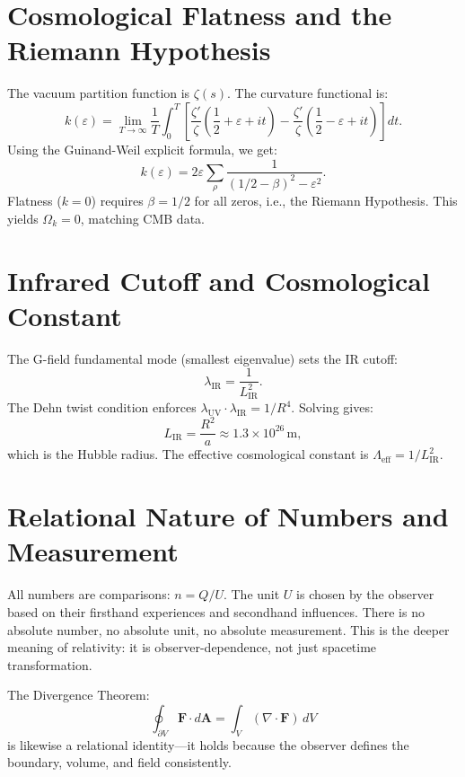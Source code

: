 \documentclass[11pt, a4paper, twocolumn]{article}
\theoremstyle{plain}
\theoremstyle{definition}
\begin{document}
\section{Cosmological Flatness and the Riemann Hypothesis}
\label{sec:riemann}

The vacuum partition function is $\zeta(s)$. The curvature functional is:
\[
k(\varepsilon) = \lim_{T\to\infty} \frac{1}{T} \int_0^T \left[ \frac{\zeta'}{\zeta}\left(\frac12+\varepsilon+it\right) - \frac{\zeta'}{\zeta}\left(\frac12-\varepsilon+it\right) \right] dt.
\]
Using the Guinand-Weil explicit formula, we get:
\[
k(\varepsilon) = 2\varepsilon \sum_{\rho} \frac{1}{(1/2-\beta)^2 - \varepsilon^2}.
\]
Flatness ($k=0$) requires $\beta = 1/2$ for all zeros, i.e., the Riemann Hypothesis. This yields $\Omega_k = 0$, matching CMB data.

\section{Infrared Cutoff and Cosmological Constant}
\label{sec:ir}

The G-field fundamental mode (smallest eigenvalue) sets the IR cutoff:
\[
\lambda_{\text{IR}} = \frac{1}{L_{\text{IR}}^2}.
\]
The Dehn twist condition enforces $\lambda_{\text{UV}}\cdot\lambda_{\text{IR}} = 1/R^4$. Solving gives:
\[
L_{\text{IR}} = \frac{R^2}{a} \approx 1.3\times10^{26}\,\text{m},
\]
which is the Hubble radius. The effective cosmological constant is $\Lambda_{\text{eff}} = 1/L_{\text{IR}}^2$.

\section{Relational Nature of Numbers and Measurement}
\label{sec:relation}

All numbers are comparisons: $n = Q/U$. The unit $U$ is chosen by the observer based on their firsthand experiences and secondhand influences. There is no absolute number, no absolute unit, no absolute measurement. This is the deeper meaning of relativity: it is observer-dependence, not just spacetime transformation.

The Divergence Theorem:
\[
\oint_{\partial V} \mathbf{F}\cdot d\mathbf{A} = \int_V (\nabla\cdot\mathbf{F})\,dV
\]
is likewise a relational identity---it holds because the observer defines the boundary, volume, and field consistently.
\end{document}
